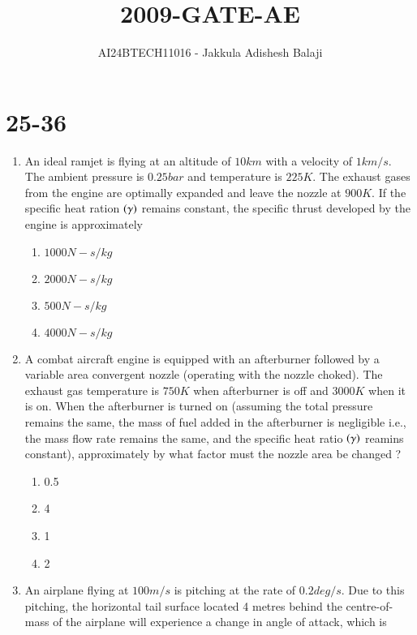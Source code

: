 \documentclass[journal]{IEEEtran}
\begin{document}

\title{2009-GATE-AE}
\author{AI24BTECH11016 - Jakkula Adishesh Balaji}
{\let\newpage\relax\maketitle}

\renewcommand{\thefigure}{\theenumi}
\renewcommand{\thetable}{\theenumi}
\setlength{\intextsep}{10pt} %
\section{25-36}
\begin{enumerate}
	\item
	An ideal ramjet is flying at an altitude of $10 km$ with a velocity of $1 km/s$. The ambient pressure is $0.25 bar$ and temperature is $225 K$. The exhaust gases from the engine are optimally expanded and leave the nozzle at $900 K$. If the specific heat ration $\left(\gamma\right)$ remains constant, the specific thrust developed by the engine is approximately
		\begin{enumerate}
			\item $1000 N-s/kg$
			\item $2000 N-s/kg$
			\item $500 N-s/kg$
			\item $4000 N-s/kg$
		\end{enumerate}
	\item
	A combat aircraft engine is equipped with an afterburner followed by a variable area convergent nozzle (operating with the nozzle choked). The exhaust gas temperature is $750 K$ when afterburner is off and $3000 K$ when it is on. When the afterburner is turned on (assuming the total pressure remains the same, the mass of fuel added in the afterburner is negligible i.e., the mass flow rate remains the same, and the specific heat ratio $\left(\gamma\right)$ reamins constant), approximately by what factor must the nozzle area be changed ?
		\begin{enumerate}
			\item 0.5
			\item 4
			\item 1
			\item 2
		\end{enumerate}
	\item
	An airplane flying at $100 m/s$ is pitching at the rate of $0.2 deg/s$. Due to this pitching, the horizontal tail surface located 4 metres behind the centre-of-mass of the airplane will experience a change in angle of attack, which is

\end{enumerate}
\end{document}
